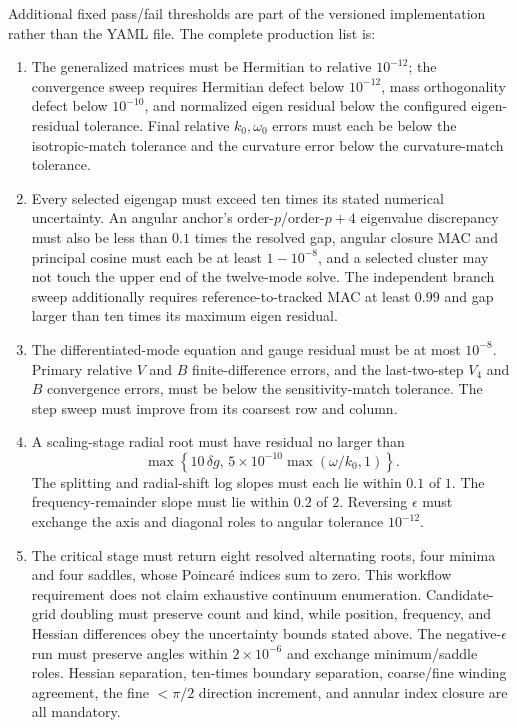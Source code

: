 Additional fixed pass/fail thresholds are part of the versioned
implementation rather than the YAML file.  The complete production list is:
{\small
\begin{enumerate}
\item The generalized matrices must be Hermitian to relative \(10^{-12}\);
the convergence sweep requires Hermitian defect below \(10^{-12}\), mass
orthogonality defect below \(10^{-10}\), and normalized eigen residual below
the configured eigen-residual tolerance.  Final relative
\(k_0,\omega_0\) errors must each be below the isotropic-match tolerance and
the curvature error below the curvature-match tolerance.

\item Every selected eigengap must exceed ten times its stated numerical
uncertainty.  An angular anchor's order-\(p\)/order-\(p+4\) eigenvalue
discrepancy must also be less than \(0.1\) times the resolved gap, angular
closure MAC and principal cosine must each be at least \(1-10^{-8}\), and a
selected cluster may not touch the upper end of the twelve-mode solve.
The independent branch sweep additionally requires reference-to-tracked MAC
at least \(0.99\) and gap larger than ten times its maximum eigen residual.

\item The differentiated-mode equation and gauge residual must be at most
\(10^{-8}\).  Primary relative \(V\) and \(B\) finite-difference errors, and
the last-two-step \(V_4\) and \(B\) convergence errors, must be below the
sensitivity-match tolerance.  The step sweep must improve from its coarsest
row and column.

\item A scaling-stage radial root must have residual no larger than
\[
 \max\!\left\{10\,\delta g,\,
 5\times10^{-10}\max(\omega/k_0,1)\right\}.
\]
The splitting and radial-shift log slopes must each lie within \(0.1\) of
\(1\).  The frequency-remainder slope must lie within \(0.2\) of \(2\).
Reversing \(\epsilon\) must exchange the axis and diagonal roles to angular
tolerance \(10^{-12}\).

\item The critical stage must return eight resolved alternating roots, four
minima and four saddles, whose Poincar\'e indices sum to zero.  This workflow
requirement does not claim exhaustive continuum enumeration.  Candidate-grid
doubling must preserve count and kind, while position, frequency, and Hessian
differences obey the uncertainty bounds stated above.  The negative-\(\epsilon\)
run must preserve angles within \(2\times10^{-6}\) and exchange
minimum/saddle roles.  Hessian separation, ten-times boundary separation,
coarse/fine winding agreement, the fine \(<\pi/2\) direction increment, and
annular index closure are all mandatory.


\end{enumerate}}

